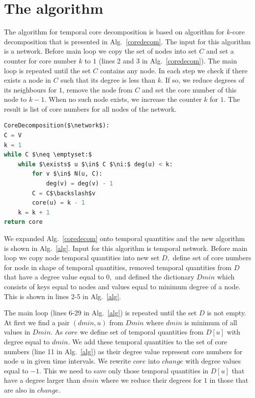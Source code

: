 \documentclass[a4paper,twoside,10pt]{article}
\newcommand{\network}{\mathcal{N}}
\begin{document}
%
%
\section{The algorithm}\label{algorithm}

The algorithm for temporal core decomposition is based on algorithm for $k$-core decomposition that is presented in Alg.~\ref{coredecom}. The input for this algorithm is a network. Before main loop we copy the set of nodes into set $C$ and set a counter for core number $k$ to $1$ (lines 2 and 3 in Alg.~\ref{coredecom}). The main loop is repeated until the set $C$ contains any node. In each step we check if there exists a node in $C$ such that its degree is less than $k$. If so, we reduce degrees of its neighbours for $1$, remove the node from $C$ and set the core number of this node to $k-1.$ When no such node exists, we increase the counter $k$ for $1.$ The result is list of core numbers for all nodes of the network.

\begin{lstlisting}[mathescape, language=Python, caption={Core decomposition algorithm.}, label={coredecom}]
CoreDecomposition($\network$):
C = V
k = 1
while C $\neq \emptyset:$
	while $\exists$ u $\in$ C $\ni:$ deg(u) < k:
		for v $\in$ N(u, C):
			deg(v) = deg(v) - 1
		C = C$\backslash$v
		core(u) = k - 1
	k = k + 1
return core
\end{lstlisting}

We expanded Alg.~\ref{coredecom} onto temporal quantities and the new algorithm is shown in Alg.~\ref{alg}. Input for this algorithm is temporal network. Before main loop we copy node temporal quantities into new set $D,$ define set of core numbers for node in shape of temporal quantities, removed temporal quantities from $D$ that have a degree value equal to $0,$ and defined the dictionary $Dmin$ which consists of keys equal to nodes and values equal to minimum degree of a node. This is shown in lines 2-5 in Alg.~\ref{alg}.

The main loop (lines 6-29 in Alg.~\ref{alg}) is repeated until the set $D$ is not empty. At first we find a pair $(dmin, u)$ from $Dmin$ where $dmin$ is minimum of all values in $Dmin.$ As $core$ we define set of temporal quantities from $D[u]$ with degree equal to $dmin.$ We add these temporal quantities to the set of core numbers (line 11 in Alg.~\ref{alg}) as their degree value represent core numbers for node $u$ in given time intervals. We rewrite $core$ into  $change$ with degree values equal to $-1.$  This we need to save only those temporal quantities in $D[u]$ that have a degree larger than $dmin$ where we reduce their degrees for $1$ in those that are also in $change.$ 
\end{document}
